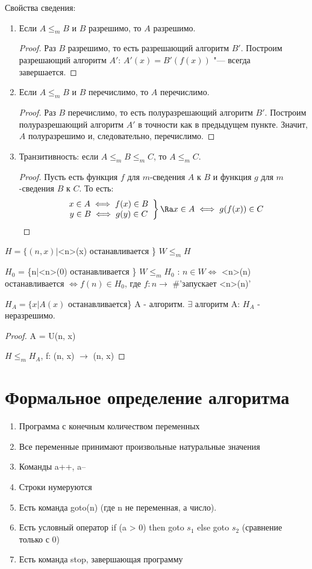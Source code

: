 Свойства сведения:
\begin{enumerate}
	\item Если $A \le_m B$ и $B$ разрешимо, то $A$ разрешимо.
		\begin{proof}
			Раз $B$ разрешимо, то есть разрешающий алгоритм $B'$.
			Построим разрешающий алгоритм $A'$: $A'(x)=B'(f(x))$ "--- всегда завершается.
		\end{proof}
	\item Если $A \le_m B$ и $B$ перечислимо, то $A$ перечислимо.
		\begin{proof}
			Раз $B$ перечислимо, то есть полуразрешающий алгоритм $B'$.
			Построим полуразрешающий алгоритм $A'$ в точности как в предыдущем пункте.
			Значит, $A$ полуразрешимо и, следовательно, перечислимо.
		\end{proof}
	\item Транзитивность: если $A \le_m B \le_m C$, то $A \le_m C$.
		\begin{proof}
			Пусть есть функция $f$ для $m$-сведения $A$ к $B$ и функция $g$ для $m$-сведения $B$ к $C$.
			То есть:
			\[
				\left.
				\begin{array}{c}
					x \in A \iff f(x) \in B \\
					y \in B \iff g(y) \in C
				\end{array}
				\right\}
				\Ra
				x \in A \iff g(f(x)) \in C
			\]
		\end{proof}
\end{enumerate}

$H = \{(n, x)|$<n>(x) останавливается \}  $W \le_m H$

$H_0$ = \{n|<n>(0) останавливается \} $W \le_m H_0$ : $n\in W \Leftrightarrow$ <n>(n) останавливается $\Leftrightarrow f(n) \in H_0$, где
$f: n \rightarrow $ \#'запускает <n>(n)'

\begin{assertion}
	$H_A = \{x|A(x)$ останавливается\} A - алгоритм. $\exists$ алгоритм A: $H_A$ - неразрешимо.
\end{assertion}
\begin{proof}
	A = U(n, x) 
	
	$H \le_m H_A$, f: (n, x) $\rightarrow$ (n, x)
\end{proof}

\section{Формальное определение алгоритма}
\begin{enumerate}
	\item Программа с конечным количеством переменных
	\item Все переменные принимают произвольные натуральные значения
	\item Команды a++, a--
	\item Строки нумеруются
	\item Есть команда goto(n) (где n не переменная, а число).
	\item Есть условный оператор if (a > 0) then goto $s_1$ else goto $s_2$ (сравнение только с 0)
	\item Есть команда stop, завершающая программу
\end{enumerate}

